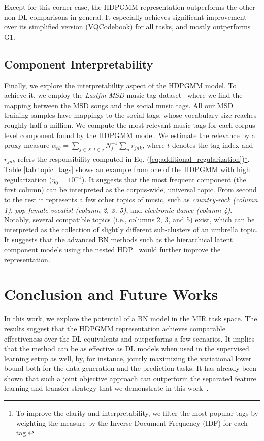 \documentclass{article}
\begin{document}
Except for this corner case, the HDPGMM representation outperforms the other non-DL comparisons in general. It especially achieves significant improvement over its simplified version (VQCodebook) for all tasks, and mostly outperforms G1.


\subsection{Component Interpretability}\label{sec:result_discussion:interpretability}

Finally, we explore the interpretability aspect of the HDPGMM model. To achieve it, we employ the \emph{Lastfm-MSD} music tag dataset~\cite{Bertin-Mahieux2011} where we find the mapping between the MSD songs and the social music tags. All our MSD training samples have mappings to the social tags, whose vocabulary size reaches roughly half a million. We compute the most relevant music tags for each corpus-level component found by the HDPGMM model. We estimate the relevance by a proxy measure $\alpha_{tk} = \sum_{j\in{X}:t\in{j}}N_{j}^{-1}\sum_{n}r_{jnk}$, where $t$ denotes the tag index and $r_{jnk}$ refers the responsibility computed in Eq. (\ref{eq:additional_regularization})\footnote{To improve the clarity and interpretability, we filter the most popular tags by weighting the measure by the Inverse Document Frequency (IDF) for each tag.}. Table \ref{tab:topic_tags} shows an example from one of the HDPGMM with high regularization ($\eta_{0}=10^{-1}$). It suggests that the most frequent component (the first column) can be interpreted as the corpus-wide, universal topic. From second to the rest it represents a few other topics of music, such as \emph{country-rock (column 1)}, \emph{pop-female vocalist (column 2, 3, 5)}, and \emph{electronic-dance (column 4)}. Notably, several compatible topics (i.e., columns 2, 3, and 5) exist, which can be interpreted as the collection of slightly different sub-clusters of an umbrella topic. It suggests that the advanced BN methods such as the hierarchical latent component models using the nested HDP~\cite{DBLP:journals/pami/PaisleyWBJ15} would further improve the representation.


\section{Conclusion and Future Works}\label{sec:conclusion}

In this work, we explore the potential of a BN model in the MIR task space.
The results suggest that the HDPGMM representation achieves comparable effectiveness over the DL equivalents and outperforms a few scenarios. It implies that the method can be as effective as DL models when used in the supervised learning setup as well, by, for instance, jointly maximizing the variational lower bound both for the data generation and the prediction tasks. It has already been shown that such a joint objective approach can outperform the separated feature learning and transfer strategy that we demonstrate in this work~\cite{DBLP:journals/taffco/WangLCCH15}.
\end{document}
